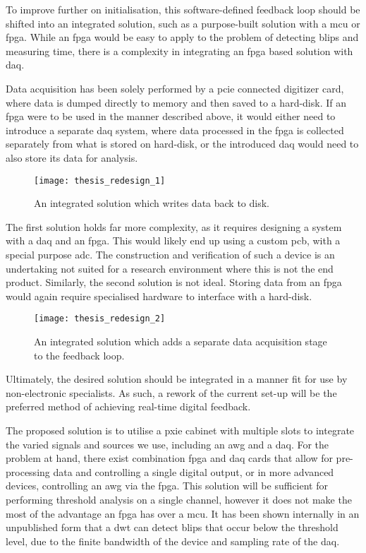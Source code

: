 \label{sec::future}
To improve further on initialisation, this software-defined feedback loop should be shifted into an integrated solution, such as a purpose-built solution with a \gls{mcu} or \gls{fpga}. While an \gls{fpga} would be easy to apply to the problem of detecting blips and measuring time, there is a complexity in integrating an \gls{fpga} based solution with \gls{daq}. 

Data acquisition has been solely performed by a \gls{pcie} connected digitizer card, where data is dumped directly to memory and then saved to a hard-disk. If an \gls{fpga} were to be used in the manner described above, it would either need to introduce a separate \gls{daq} system, where data processed in the \gls{fpga} is collected separately from what is stored on hard-disk, or the introduced \gls{daq} would need to also store its data for analysis.

\begin{figure}[htbp]
	\centering
	\texttt{[image: thesis\_redesign\_1]}
	\caption{An integrated solution which writes data back to disk.}
	\label{fig::redesign_1}
\end{figure}

The first solution holds far more complexity, as it requires designing a system with a \gls{daq} and an \gls{fpga}. This would likely end up using a custom \gls{pcb}, with a special purpose \gls{adc}. The construction and verification of such a device is an undertaking not suited for a research environment where this is not the end product. Similarly, the second solution is not ideal. Storing data from an \gls{fpga} would again require specialised hardware to interface with a hard-disk. 


\begin{figure}[htbp]
	\centering
	\texttt{[image: thesis\_redesign\_2]}
	\caption{An integrated solution which adds a separate data acquisition stage to the feedback loop.}
	\label{fig::redesign_2}
\end{figure}

Ultimately, the desired solution should be integrated in a manner fit for use by non-electronic specialists. As such, a rework of the current set-up will be the preferred method of achieving real-time digital feedback.

The proposed solution is to utilise a \gls{pxie} cabinet with multiple slots to integrate the varied signals and sources we use, including an \gls{awg} and a \gls{daq}. For the problem at hand, there exist combination \gls{fpga} and \gls{daq} cards that allow for pre-processing data and controlling a single digital output, or in more advanced devices, controlling an \gls{awg} via the \gls{fpga}. This solution will be sufficient for performing threshold analysis on a single channel, however it does not make the most of the advantage an \gls{fpga} has over a \gls{mcu}. It has been shown internally in an unpublished form that a \gls{dwt} can detect blips that occur below the threshold level, due to the finite bandwidth of the device and sampling rate of the \gls{daq}.

